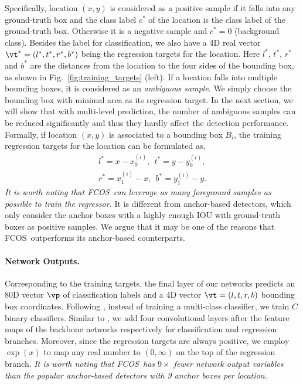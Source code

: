 \documentclass[10pt,twocolumn,letterpaper]{article}
\newcommand{\1}{{\mathbbm{1}}}           %
\def\Ours{{FCNDet}\xspace}
\def\Ours{{FCOS}\xspace}
\begin{document}
Specifically, location $(x, y)$ is considered as a positive sample if it falls into any ground-truth box and the class label $c^*$ of the location is the class label of the ground-truth box.
Otherwise it is a negative sample and $c^* = 0$ (background class). Besides the label for classification, we also have a 4D real vector $\vt^* = (l^*, t^*, r^*, b^*)$ 
being the regression targets for the location. Here $l^*$, $t^*$, $r^*$ and $b^*$ are the distances from the location to the four sides of the bounding box,
%
%
%
%
as shown in Fig.~\ref{fig:training_targets} (left). If a location falls into multiple bounding boxes, it is considered as an \emph{ambiguous sample}. We simply choose the bounding box with minimal area as its regression target. In the next section, we will show that with multi-level prediction, the number of ambiguous samples can be reduced significantly and thus they hardly affect the detection performance. Formally, if location $(x, y)$ is associated to a bounding box $B_i$, the training regression targets for the location can be formulated as,
%
\begin{equation} \label{regression_targets}
\begin{aligned}
    l^* = x - x^{(i)}_0,~~t^* = y - y^{(i)}_0, \\
    r^* = x^{(i)}_1 - x,~~b^* = y^{(i)}_1 - y.
\end{aligned}
\end{equation}
{\it It is worth noting that \Ours\ can leverage as many foreground samples as possible to train the regressor.} It is different from anchor-based detectors, which only consider the anchor boxes with a highly enough IOU with ground-truth boxes as positive samples. We argue that it may be one of the reasons that \Ours\ outperforms its anchor-based counterparts.


\paragraph{Network Outputs.} Corresponding to the training targets, the final layer of our networks predicts an 80D vector $\vp$ 
%
of classification labels
and a 4D vector  $\vt =(l, t, r, b)$ 
%
bounding box coordinates. 
%
%
%
Following \cite{lin2017focal}, instead of training a multi-class classifier, 
we train $ C $ binary classifiers. 
%
Similar to \cite{lin2017focal}, we add four convolutional layers after the feature maps of the backbone networks respectively for classification and regression branches. 
Moreover, since the regression targets are always positive, we employ $\exp(x)$ to map any real number to $(0, \infty)$ on the top of the regression branch. \emph{It is worth noting that \Ours\ has $9\times$ fewer network output variables  than the popular anchor-based detectors \cite{lin2017focal, ren2015faster} with 9 anchor boxes per location.}
\end{document}
